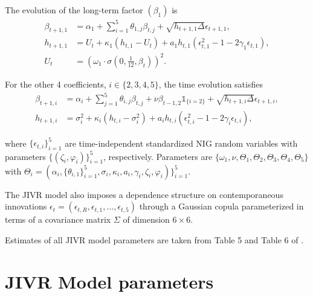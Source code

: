 The evolution of the long-term factor $(\beta_{1})$ is
\begin{align}
     \beta_{t+1,1}&= \alpha_{1}+\sum_{i=1}^{5}\theta_{1,j}\beta_{t,j}+\sqrt{h_{t+1,1}\Delta}\epsilon_{t+1,1}, \nonumber\\
     h_{t+1,1} &= U_{t}+\kappa_{1}(h_{t,1}-U_{t})+a_{1}h_{t,1}(\epsilon_{t,1}^{2}-1-2\gamma_{1}\epsilon_{t,1}), \label{beta1series}\\
     U_{t} &= \left(\omega_{1}\cdot \sigma\left(0,\frac{1}{12},\beta_{t}\right)\right)^2. \nonumber
 \end{align}

For the other 4 coefficients, $i\in\{2,3,4,5 \}$, the time evolution satisfies
\begin{align}
    \beta_{t+1,i} &= \alpha_{i}+\sum_{j=1}^{5}\theta_{i,j}\beta_{t,j}+\nu\beta_{t-1,2}\mathds{1}_{\{i=2\}}+\sqrt{h_{t+1,i}\Delta}\epsilon_{t+1,i}, \nonumber\\
    h_{t+1,i} &= \sigma_{i}^{2}+\kappa_{i}(h_{t,i}-\sigma_{i}^{2})+a_{i}h_{t,i}(\epsilon_{t,i}^{2}-1-2\gamma_{i}\epsilon_{t,i}),
    \label{restofbetas}
\end{align}

where $\{\epsilon_{t,i} \}_{i=1}^{5}$ are time-independent standardized NIG random variables with parameters $\{ (\zeta_{i},\varphi_{i}) \}_{i=1}^{5}$, respectively. Parameters are $\{\omega_{1},\nu, \Theta_{1}, \Theta_{2}, \Theta_{3}, \Theta_{4}, \Theta_{5}\}$ with $\Theta_{i} = (\alpha_{i},\{\theta_{i,1}\}_{i=1}^{5},\sigma_{i},\kappa_{i},a_{i},\gamma_{i},\zeta_{i},\varphi_{i})\}_{i=1}^{5}$.

The JIVR model also imposes a dependence structure on contemporaneous innovations $\epsilon_{t} = (\epsilon_{t,R},\epsilon_{t,1},...,\epsilon_{t,5})$ through a Gaussian copula parameterized in terms of a covariance matrix $\Sigma$ of dimension ${6\times 6}$. 

Estimates of all JIVR model parameters are taken from Table 5 and Table 6 of \cite{Frnacois2023}. 


\section{JIVR Model parameters}

